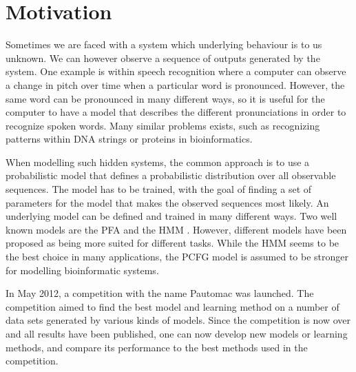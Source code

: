 \section{Motivation}
Sometimes we are faced with a system which underlying behaviour is to us unknown. We can however observe a sequence of outputs generated by the system. One example is within speech recognition \cite{Rabiner89hmm} where a computer can observe a change in pitch over time when a particular word is pronounced. However, the same word can be pronounced in many different ways, so it is useful for the computer to have a model that describes the different pronunciations in order to recognize spoken words. Many similar problems exists, such as recognizing patterns within DNA strings or proteins in bioinformatics\cite{Sakakibara2005}.

When modelling such hidden systems, the common approach is to use a probabilistic model that defines a probabilistic distribution over all observable sequences. The model has to be trained, with the goal of finding a set of parameters for the model that makes the observed sequences most likely. An underlying model can be defined and trained in many different ways. Two well known models are the PFA \cite{pazintroduction} and the HMM \cite{Rabiner89hmm}. However, different models have been proposed as being more suited for different tasks. While the HMM seems to be the best choice in many applications, the PCFG model is assumed to be stronger for modelling bioinformatic systems\cite{Sakakibara2005}.

In May 2012, a competition with the name Pautomac was launched. The competition aimed to find the best model and learning method on a number of data sets generated by various kinds of models. Since the competition is now over and all results have been published, one can now develop new models or learning methods, and compare its performance to the best methods used in the competition.